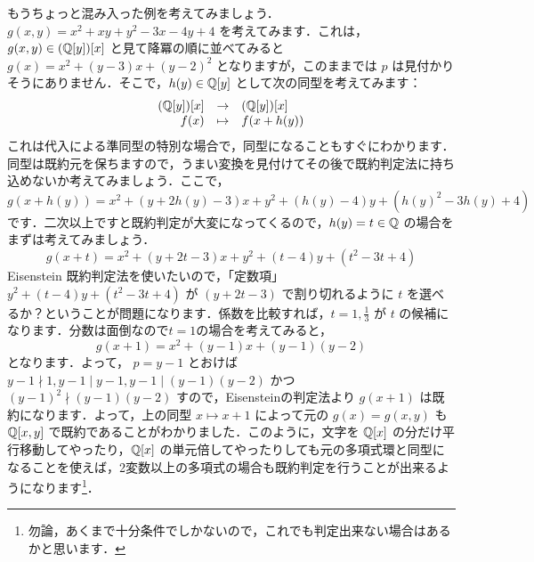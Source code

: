 \documentclass[a4j]{jsarticle}
\begin{document}
もうちょっと混み入った例を考えてみましょう．$g(x, y) = x^2 + xy + y^2 - 3x - 4y + 4$ を考えてみます．これは，$g(x, y) \in (\mathbb{Q}[y])[x]$ と見て降冪の順に並べてみると $g(x) = x^2 + (y-3)x + (y-2)^2$ となりますが，このままでは $p$ は見付かりそうにありません．そこで，$h(y) \in \mathbb{Q}[y]$ として次の同型を考えてみます：
\[
\begin{array}{rcl}
  (\mathbb{Q}[y])[x] & \to & (\mathbb{Q}[y])[x] \\
  f(x) & \mapsto & f(x + h(y))
\end{array}
\]
これは代入による準同型の特別な場合で，同型になることもすぐにわかります．同型は既約元を保ちますので，うまい変換を見付けてその後で既約判定法に持ち込めないか考えてみましょう．ここで，
\[
 g(x + h(y)) = x^2 + (y+2h(y)-3)x + y^2 + (h(y)-4)y + (h(y)^2 - 3h(y) + 4)
\]
です．二次以上ですと既約判定が大変になってくるので，$h(y) = t \in \mathbb{Q}$ の場合をまずは考えてみましょう．
\[
 g(x + t) = x^2 + (y+2t-3)x + y^2 + (t-4)y + (t^2 - 3t + 4)
\]
Eisenstein 既約判定法を使いたいので，「定数項」$y^2 + (t-4)y + (t^2 - 3t + 4)$ が $(y+2t-3)$ で割り切れるように $t$ を選べるか？ということが問題になります．係数を比較すれば，$t = 1, \frac{1}{3}$ が $t$ の候補になります．分数は面倒なので$t=1$の場合を考えてみると，
\[
 g(x + 1) = x^2 + (y-1)x + (y-1)(y-2)
\]
となります．よって， $p = y-1$ とおけば $y - 1 \nmid 1, y-1 \mid y-1, y-1 \mid (y-1)(y-2)$ かつ $(y-1)^2 \nmid (y-1)(y-2)$ すので，Eisensteinの判定法より $g(x+1)$ は既約になります．よって，上の同型 $x \mapsto x + 1$ によって元の $g(x) = g(x,y)$ も $\mathbb{Q}[x, y]$ で既約であることがわかりました．このように，文字を $\mathbb{Q}[x]$ の分だけ平行移動してやったり，$\mathbb{Q}[x]$ の単元倍してやったりしても元の多項式環と同型になることを使えば，2変数以上の多項式の場合も既約判定を行うことが出来るようになります\footnote{勿論，あくまで十分条件でしかないので，これでも判定出来ない場合はあるかと思います．}．
\end{document}

